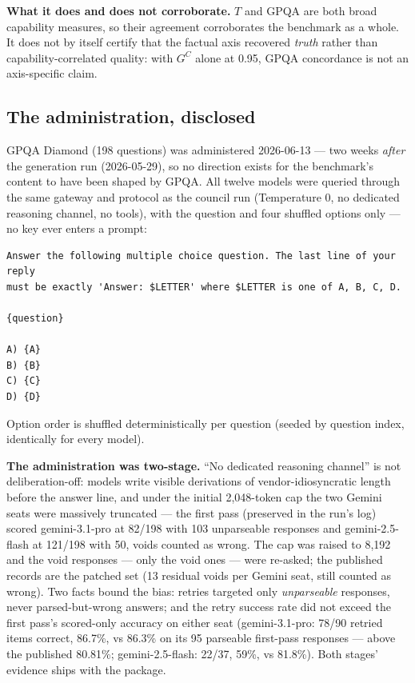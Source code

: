 \documentclass{article}
\begin{document}
\textbf{What it does and does not corroborate.} \(T\) and GPQA are both broad capability measures, so their agreement corroborates the benchmark as a whole. It does not by itself certify that the factual axis recovered \emph{truth} rather than capability-correlated quality: with \(G^{C}\) alone at 0.95, GPQA concordance is not an axis-specific claim.

\subsection{The administration, disclosed}\label{the-administration-disclosed}

GPQA Diamond (198 questions) was administered 2026-06-13 --- two weeks \emph{after} the generation run (2026-05-29), so no direction exists for the benchmark's content to have been shaped by GPQA. All twelve models were queried through the same gateway and protocol as the council run (Temperature 0, no dedicated reasoning channel, no tools), with the question and four shuffled options only --- no key ever enters a prompt:

\begin{lstlisting}
Answer the following multiple choice question. The last line of your reply
must be exactly 'Answer: $LETTER' where $LETTER is one of A, B, C, D.

{question}

A) {A}
B) {B}
C) {C}
D) {D}
\end{lstlisting}

Option order is shuffled deterministically per question (seeded by question index, identically for every model).

\textbf{The administration was two-stage.} ``No dedicated reasoning channel'' is not deliberation-off: models write visible derivations of vendor-idiosyncratic length before the answer line, and under the initial 2,048-token cap the two Gemini seats were massively truncated --- the first pass (preserved in the run's log) scored gemini-3.1-pro at 82/198 with 103 unparseable responses and gemini-2.5-flash at 121/198 with 50, voids counted as wrong. The cap was raised to 8,192 and the void responses --- only the void ones --- were re-asked; the published records are the patched set (13 residual voids per Gemini seat, still counted as wrong). Two facts bound the bias: retries targeted only \emph{unparseable} responses, never parsed-but-wrong answers; and the retry success rate did not exceed the first pass's scored-only accuracy on either seat (gemini-3.1-pro: 78/90 retried items correct, 86.7\%, vs 86.3\% on its 95 parseable first-pass responses --- above the published 80.81\%; gemini-2.5-flash: 22/37, 59\%, vs 81.8\%). Both stages' evidence ships with the package.
\end{document}
